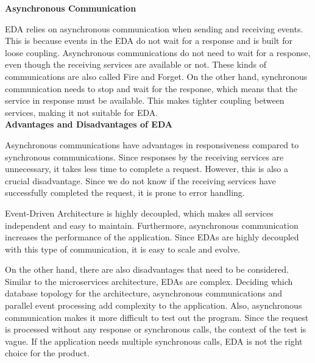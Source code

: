 \noindent \textbf{Asynchronous Communication}

EDA relies on asynchronous communication when sending and receiving events. This is because events in the EDA do not wait for a response
and is built for loose coupling.
Asynchronous communications do not need to wait for a response, even though the receiving services are available or not.
These kinds of communications are also called Fire and Forget. On the other hand, synchronous communication needs to stop and wait for the response,
which means that the service in response must be available. This makes tighter coupling between services, making it not suitable for EDA. \\

\noindent \textbf{Advantages and Disadvantages of EDA}

Asynchronous communications have advantages in responsiveness compared to synchronous communications.
Since responses by the receiving services are unnecessary, it takes less time to complete a request.
However, this is also a crucial disadvantage. Since we do not know if the receiving services have successfully completed the request,
it is prone to error handling. 

Event-Driven Architecture is highly decoupled, which makes all services independent and easy to maintain.
Furthermore, asynchronous communication increases the performance of the application.
Since EDAs are highly decoupled with this type of communication, it is easy to scale and evolve.

On the other hand, there are also disadvantages that need to be considered.
Similar to the microservices architecture, EDAs are complex. Deciding which database topology for the architecture,
asynchronous communications and parallel event processing add complexity to the application.
Also, asynchronous communication makes it more difficult to test out the program.
Since the request is processed without any response or synchronous calls, the context of the test is vague.
If the application needs multiple synchronous calls, EDA is not the right choice for the product.

